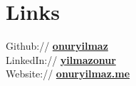 \section{Links} 
\sectionspacehalf

Github:// \href{https://github.com/onuryilmaz}{\bf onuryilmaz} \\
LinkedIn:// \href{https://tr.linkedin.com/in/yilmazonur}{\bf yilmazonur} \\
Website:// \href{https://onuryilmaz.me}{\bf onuryilmaz.me}

\sectionspacehalf
